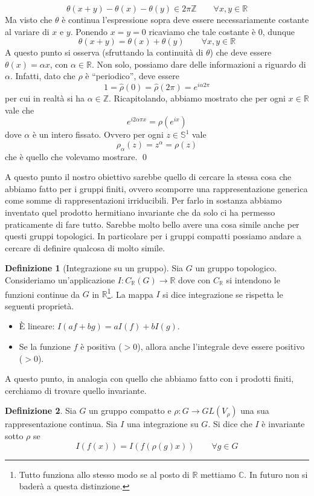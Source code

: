 \documentclass[11pt]{article}
\theoremstyle{plain}
\theoremstyle{definition}
\newtheorem{defn}{Definizione}[section]
\theoremstyle{remark}
\newcommand{\C}{\mathbb{C}}
\newcommand{\R}{\mathbb{R}}
\newcommand{\Z}{\mathbb{Z}}
\begin{document}
\[ \theta(x+y) - \theta(x) - \theta(y) \in 2\pi \Z \qquad \forall x, y \in \R \]
Ma visto che $\theta$ è continua l'espressione sopra deve essere necessariamente costante al variare di $x$ e $y$. Ponendo $x=y=0$ ricaviamo che tale costante è $0$, dunque
\[ \theta(x + y) = \theta(x ) + \theta (y) \qquad \forall x,y\in \R\]
A questo punto si osserva (sfruttando la continuità di $\theta$) che deve essere $\theta(x) = \alpha x$, con $\alpha \in \R$. Non solo, possiamo dare delle informazioni a riguardo di $\alpha$. Infatti, dato che $\hat\rho$ è ``periodico'', deve essere
\[ 1 = \hat\rho(0) = \hat\rho(2\pi) = e^{i\alpha 2\pi}\]
per cui in realtà si ha $\alpha \in \Z$. 
Ricapitolando, abbiamo mostrato che per ogni $x\in\R$ vale che
\[e^{i 2\alpha\pi x} = \rho(e^{ix}) \]
dove $\alpha$ è un intero fissato. Ovvero per ogni $z\in\mathbb{S}^1$ vale
\[ \rho_\alpha(z) = z^\alpha = \rho(z) \]
che è quello che volevamo mostrare.
\qed

A questo punto il nostro obiettivo sarebbe quello di cercare la stessa cosa che abbiamo fatto per i gruppi finiti, ovvero scomporre una rappresentazione generica come somme di rappresentazioni irriducibili. Per farlo in sostanza abbiamo inventato quel prodotto hermitiano invariante che da solo ci ha permesso praticamente di fare tutto. Sarebbe molto bello avere una cosa simile anche per questi gruppi topologici. In particolare per i gruppi compatti possiamo andare a cercare di definire qualcosa di molto simile.


\begin{defn}[Integrazione su un gruppo]
Sia $G$ un gruppo topologico. Consideriamo un'applicazione $I: C_{\R}(G) \to \R$
dove con $C_\R$ si intendono le funzioni continue da $G$ in $\R$\footnote{Tutto funziona allo stesso modo se al posto di $\R$ mettiamo $\C$. In futuro non si baderà a questa distinzione.}. La mappa $I$ si dice integrazione se rispetta le seguenti proprietà.
\begin{itemize}
\item \`E lineare: $I(a f + b g) = aI(f) + bI(g)$.
\item Se la funzione $f$ è positiva ($ > 0$), allora anche l'integrale deve essere positivo ($> 0$).
\end{itemize}
\end{defn}


A questo punto, in analogia con quello che abbiamo fatto con i prodotti finiti, cerchiamo di trovare quello invariante. 

\begin{defn} Sia $G$ un gruppo compatto e $\rho: G \to GL(V_\rho)$ una sua rappresentazione continua. Sia $I$ una integrazione su $G$. Si dice che $I$ è invariante sotto $\rho$ se 
\[ I(f(x)) = I(f(\rho(g) x)) \qquad \forall g \in G\]
\end{defn}
\end{document}
